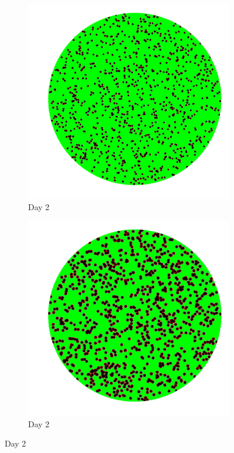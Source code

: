 \documentclass[a4paper]{article}
\begin{document}
\begin{center}
\begin{minipage}{0.65\linewidth}
\begin{figure}[H]
    \begin{subfigure}[b]{0.4\linewidth}
        \includegraphics[width=\linewidth]{cell_to_cell_photos/celltocell1.png}
        \caption{Day 2}
    \end{subfigure}
    \begin{subfigure}[b]{0.4\linewidth}
        \includegraphics[width=\linewidth]{cell_free_photos/cellfree1.png}
        \caption{Day 2}
    \end{subfigure}
    

\end{figure}
\end{minipage}
\end{center}
\end{document}
